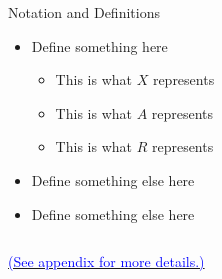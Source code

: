 \documentclass[9pt,aspectratio=169]{beamer}
\begin{document}
\begin{frame}{\hypertarget{notation}{Notation and Definitions}}
\begin{itemize}
    \item Define something here
    \vspace{1mm}
    \begin{itemize}\setlength\itemsep{1mm}
        \item This is what $X$ represents
        \item This is what $A$ represents
        \item This is what $R$ represents
    \end{itemize}
    \item Define something else here
    \item Define something else here
\end{itemize}

\begin{columns}[T]
\begin{column}{.5\textwidth}
\end{column}
\begin{column}{.5\textwidth}
\end{column}%
\end{columns}

\vspace{4mm}
\begin{center}
    \hyperlink{appendix:notation}{\textcolor{blue}{\small {(See appendix for more details.)}}}
\end{center}

\end{frame}
\end{document}
